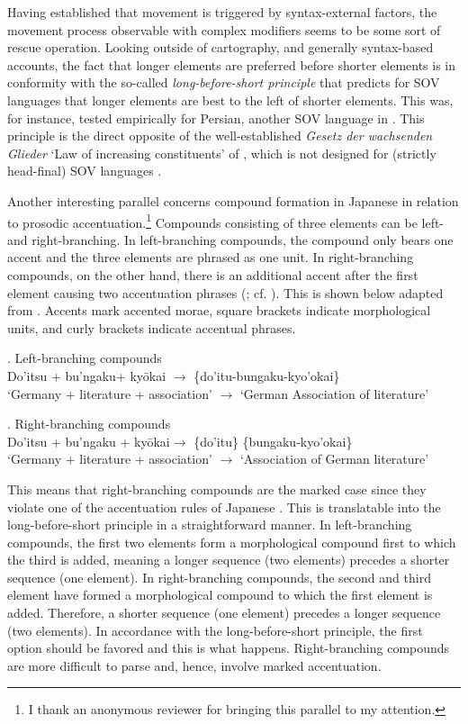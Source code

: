 \documentclass [output=book,colorlinks,citecolor=brown]{langscibook}
\begin{document}
Having established that movement is triggered by syntax-external factors, the movement process observable with complex modifiers seems to be some sort of rescue operation. Looking outside of cartography, and generally syntax-based accounts, the fact that longer elements are preferred before shorter elements is in conformity with the so-called \textit{long-before-short principle} that predicts for SOV languages that longer elements are best to the left of shorter elements. This was, for instance, tested empirically for Persian, another SOV language in \citet{faghiri:2020:word}. This principle is the direct opposite of the well-established \textit{Gesetz der wachsenden Glieder} `Law of increasing constituents' of \citet{behaghel:1909:glieder}, which is not designed for (strictly head-final) SOV languages .

Another interesting parallel concerns compound formation in Japanese in relation to prosodic accentuation.\footnote{I thank an anonymous reviewer for bringing this parallel to my attention.} Compounds consisting of three elements can be left- and right-branching. In left-branching compounds, the compound only bears one accent and the three elements are phrased as one unit. In right-branching compounds, on the other hand, there is an additional accent after the first element causing two accentuation phrases (\citealt[12–14]{kubozono:2005:rendaku}; cf. \citealt{nishiyama:2017:phrasal}). This is shown below adapted from \citet[12–14]{kubozono:2005:rendaku}. Accents mark accented morae, square brackets indicate morphological units, and curly brackets indicate accentual phrases.

\ex. Left-branching compounds \\
\lbrack Do’itsu + bu'ngaku\rbrack + kyōkai $\rightarrow$ \{do'itu-bungaku-kyo'okai\}  \\
`Germany + literature + association' $\rightarrow$ `German Association of literature'

\ex. Right-branching compounds \\
Do’itsu + \lbrack bu'ngaku + kyōkai\rbrack $\rightarrow$ \{do'itu\} \{bungaku-kyo'okai\}  \\
`Germany + literature + association' $\rightarrow$ `Association of German literature'

This means that right-branching compounds are the marked case since they violate one of the accentuation rules of Japanese \citep[153]{nishiyama:2017:phrasal}. This is translatable into the long-before-short principle in a straightforward manner. In left-branching compounds, the first two elements form a morphological compound first to which the third is added, meaning a longer sequence (two elements) precedes a shorter sequence (one element). In right-branching compounds, the second and third element have formed a morphological compound to which the first element is added. Therefore, a shorter sequence (one element) precedes a longer sequence (two elements). In accordance with the long-before-short principle, the first option should be favored and this is what happens. Right-branching compounds are more difficult to parse and, hence, involve marked accentuation.
\end{document}
